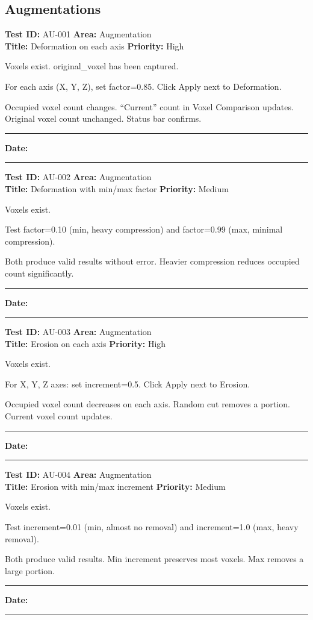 \documentclass[12pt,a4paper]{article}
\newenvironment{testcase}[4]{%
  \smallskip
  \noindent\textbf{Test ID:} #1 \hfill \textbf{Area:} #2 \\
  \textbf{Title:} #3 \hfill \textbf{Priority:} #4
  \begin{description}[leftmargin=2em,style=nextline]
    \item[\textbf{Preconditions:}]
}{%
    \item[\textbf{Steps:}]
    \item[\textbf{Expected Result:}]
    \item[\textbf{Status:}] \rule{3cm}{0.4pt} \hspace{1em} \textbf{Date:} \rule{3cm}{0.4pt}
    \item[\textbf{Notes:}]
  \end{description}
  \smallskip
}
\begin{document}
\subsection{Augmentations}

\begin{testcase}{AU-001}{Augmentation}{Deformation on each axis}{High}
  \item Voxels exist. original\_voxel has been captured.
  \item For each axis (X, Y, Z), set factor=0.85. Click Apply next to Deformation.
  \item Occupied voxel count changes. ``Current'' count in Voxel Comparison updates. Original voxel count unchanged. Status bar confirms.
\end{testcase}

\begin{testcase}{AU-002}{Augmentation}{Deformation with min/max factor}{Medium}
  \item Voxels exist.
  \item Test factor=0.10 (min, heavy compression) and factor=0.99 (max, minimal compression).
  \item Both produce valid results without error. Heavier compression reduces occupied count significantly.
\end{testcase}

\begin{testcase}{AU-003}{Augmentation}{Erosion on each axis}{High}
  \item Voxels exist.
  \item For X, Y, Z axes: set increment=0.5. Click Apply next to Erosion.
  \item Occupied voxel count decreases on each axis. Random cut removes a portion. Current voxel count updates.
\end{testcase}

\begin{testcase}{AU-004}{Augmentation}{Erosion with min/max increment}{Medium}
  \item Voxels exist.
  \item Test increment=0.01 (min, almost no removal) and increment=1.0 (max, heavy removal).
  \item Both produce valid results. Min increment preserves most voxels. Max removes a large portion.
\end{testcase}
\end{document}

